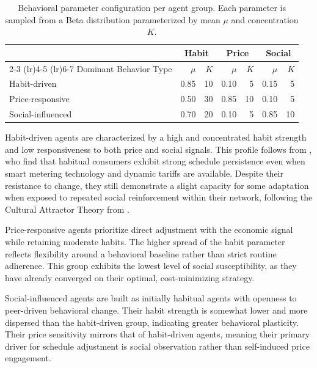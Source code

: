 \documentclass[11pt, a4paper]{article}
\begin{document}
\begin{table}
    \caption{Behavioral parameter configuration per agent group. Each parameter is sampled from a Beta distribution parameterized by mean $\mu$ and concentration $K$.}
    \label{tab:behavioral_params}
    \centering
    \small
    \begin{tabular}{lrrrrrr}
        \toprule
                                  & \multicolumn{2}{c}{Habit}   & \multicolumn{2}{c}{Price}   & \multicolumn{2}{c}{Social}  \\
                                    \cmidrule(lr){2-3}             \cmidrule(lr){4-5}             \cmidrule(lr){6-7}
        Dominant Behavior Type    & $\mu$  & $K$                 & $\mu$  & $K$                 & $\mu$  & $K$                 \\
        \midrule
        Habit-driven              & 0.85   & 10                  & 0.10   & 5                   & 0.15   & 5                   \\
        \midrule
        Price-responsive          & 0.50   & 30                  & 0.85   & 10                  & 0.10   & 5                   \\
        \midrule
        Social-influenced         & 0.70   & 20                  & 0.10   & 5                   & 0.85   & 10                  \\
        \bottomrule
    \end{tabular}
\end{table}
Habit-driven agents are characterized by a high and concentrated habit strength and low responsiveness to both price and social signals. This profile follows from \textcite{haseler_promoting_2024}, who find that habitual consumers exhibit strong schedule persistence even when smart metering technology and dynamic tariffs are available. Despite their resistance to change, they still demonstrate a slight capacity for some adaptation when exposed to repeated social reinforcement within their network, following the Cultural Attractor Theory from \textcite{falandays_emergence_2022}.

Price-responsive agents prioritize direct adjustment with the economic signal while retaining moderate habits. The higher spread of the habit parameter reflects flexibility around a behavioral baseline rather than strict routine adherence. This group exhibits the lowest level of social susceptibility, as they have already converged on their optimal, cost-minimizing strategy.

Social-influenced agents are built as initially habitual agents with openness to peer-driven behavioral change. Their habit strength is somewhat lower and more dispersed than the habit-driven group, indicating greater behavioral plasticity. Their price sensitivity mirrors that of habit-driven agents, meaning their primary driver for schedule adjustment is social observation rather than self-induced price engagement. 
\end{document}
